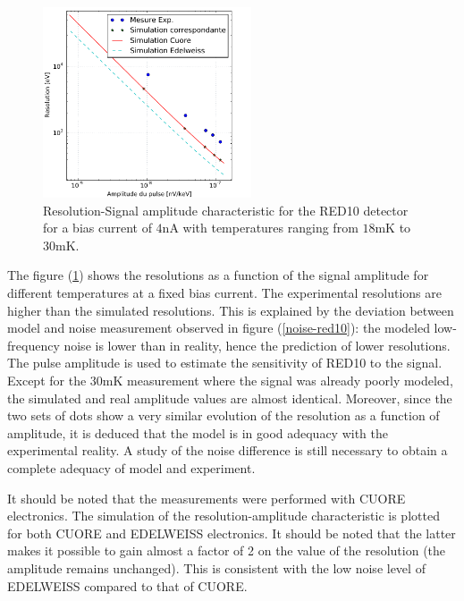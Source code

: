 \begin{figure}[!ht]
\begin{center}
\includegraphics[width=0.55\textwidth]{Images/resamp_fin_fin.pdf}
\end{center}
\caption{Resolution-Signal amplitude characteristic for the RED10 detector for a bias current of $4$nA with temperatures ranging from $18$mK to $30$mK.}
\label{amp-res-red10}
\end{figure}


The figure (\ref{amp-res-red10}) shows the resolutions as a function of the signal amplitude for different temperatures at a fixed bias current. The experimental resolutions are higher than the simulated resolutions. This is explained by the deviation between model and noise measurement observed in figure (\ref{noise-red10}): the modeled low-frequency noise is lower than in reality, hence the prediction of lower resolutions. The pulse amplitude is used to estimate the sensitivity of RED10 to the signal. Except for the $30$mK measurement where the signal was already poorly modeled, the simulated and real amplitude values are almost identical. Moreover, since the two sets of dots show a very similar evolution of the resolution as a function of amplitude, it is deduced that the model is in good adequacy with the experimental reality. A study of the noise difference is still necessary to obtain a complete adequacy of model and experiment.

It should be noted that the measurements were performed with CUORE electronics. The simulation of the resolution-amplitude characteristic is plotted for both CUORE and EDELWEISS electronics. It should be noted that the latter makes it possible to gain almost a factor of 2 on the value of the resolution (the amplitude remains unchanged). This is consistent with the low noise level of EDELWEISS compared to that of CUORE.

